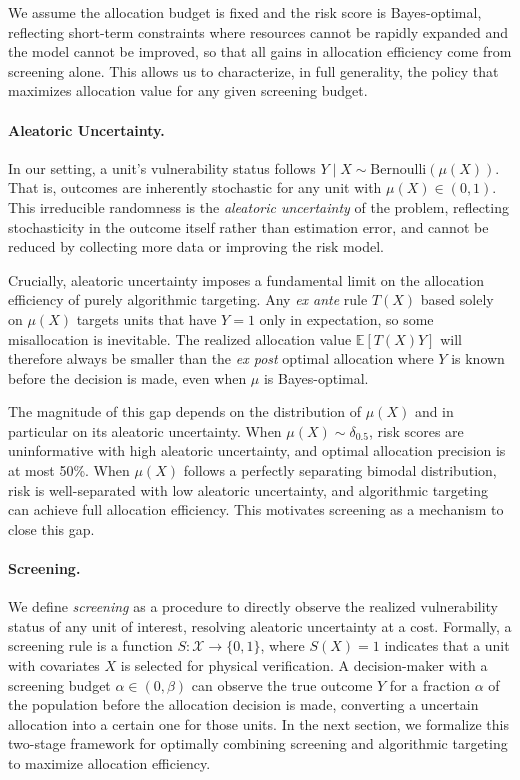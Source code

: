 \begin{remark}
    We assume the allocation budget is fixed and the risk score is Bayes-optimal, reflecting  short-term constraints where resources cannot be rapidly expanded and the model cannot be improved, so that all gains in allocation efficiency come from screening alone. This allows us to characterize, in full generality, the policy that maximizes allocation value for any given screening budget.
\end{remark}

\paragraph{Aleatoric Uncertainty.} In our setting, a unit's vulnerability status follows $Y \mid X \sim \text{Bernoulli}(\mu(X))$. That is, outcomes are inherently stochastic for any unit with $\mu(X) \in (0,1)$. This irreducible randomness is the \textit{aleatoric uncertainty} of the problem, reflecting stochasticity in the outcome itself rather than estimation error, and cannot be reduced by collecting more data or improving the risk model.

Crucially, aleatoric uncertainty imposes a fundamental limit on the allocation efficiency of purely algorithmic targeting. Any \textit{ex ante} rule $T(X)$ based solely on $\mu(X)$ targets units that have $Y=1$ only in expectation, so some misallocation is inevitable. The realized allocation value $\mathbb{E}[T(X)Y]$ will therefore always be smaller than the \textit{ex post} optimal allocation where $Y$ is known before the decision is made, even when $\mu$ is Bayes-optimal. 

The magnitude of this gap depends on the distribution of $\mu(X)$ and in particular on its aleatoric uncertainty. When $\mu(X) \sim \delta_{0.5}$, risk scores are uninformative with high aleatoric uncertainty, and optimal allocation precision is at most 50\%. When $\mu(X)$ follows a perfectly separating bimodal distribution, risk is well-separated with low aleatoric uncertainty, and algorithmic targeting can achieve full allocation efficiency. This motivates screening as a mechanism to close this gap.




\paragraph{Screening.} We define \textit{screening} as a procedure to directly observe the realized vulnerability status of any unit of interest, resolving aleatoric uncertainty at a cost. Formally, a screening rule is a function $S: \mathcal{X} \to \{0,1\}$, where $S(X) = 1$ indicates that a unit with covariates $X$ is selected for physical verification. A decision-maker with a screening budget $\alpha \in (0, \beta)$ can observe the true outcome $Y$ for a fraction $\alpha$ of the population before the allocation decision is made, converting a uncertain allocation into a certain one for those units. In the next section, we formalize this two-stage framework for optimally combining screening and algorithmic targeting to maximize allocation efficiency.



